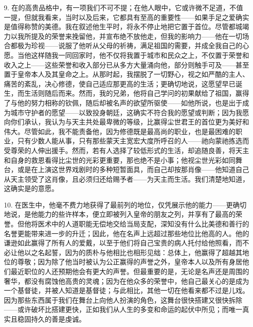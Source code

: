 9. 在的高贵品格中，有一项我们不可不提；在他人眼中，它或许微不足道，不值一提，但就我看来，当时以及后来，它都具有至高的重要性——如果手足之爱确实是值得称赞的美德。我在叙述他生平时，将永不停止地把它置于首位。尽管都城竭力以我所提及的荣誉来挽留他，并宣布绝不放他走，但我的影响力——他在一切场合都极为珍视——说服了他听从父母的祈祷，满足祖国的需要，并成全我自己的心愿。当他这样随我一同回家时，他不仅将我置于城市和民众之上，不仅置于荣誉和收入之上——这些荣誉和收入部分已从多方大量涌向他，部分则触手可及——甚至置于皇帝本人及其皇命之上。从那时起，我摆脱了一切野心，视之如严酷的主人、痛苦的紊乱，决心修德，使自己适应那更高的生活；更确切地说，这愿望早已诞生，而生活则随后而来。然而，我的兄弟，他将自己学问的初果献给了祖国，赢得了与他的努力相称的钦佩，随后却被名声的欲望所驱使——如他所说，也是出于成为城市守护者的愿望——以致投身朝廷，这确实不符合我的愿望或判断；因为我愿向你们承认，我认为与天主共处最卑微的等级，比赢得尘世君王的首位更为美好和伟大。尽管如此，我不能责备他，因为修德既是最高尚的职业，也是最困难的职业，只有少数人能从事，只有那些蒙天主宽宏大度所呼召的人——祂向蒙祂拣选而受尊荣的人伸出援手。然而，若有人选择了较低形式的生活，却追随良善，将天主和自身的救恩看得比尘世的光彩更重要，那也绝不是小事；他视尘世光彩如同舞台，或是在上演这世界戏剧时的多种短暂面具，而自己却按那肖像——他知道自己从天主领受了这肖像，且必须归还给赐予者——为天主而生活。我们清楚地知道，这确实是的意愿。\par

10. 在医生中，他毫不费力地获得了最前列的地位，仅凭展示他的能力——更确切地说，是他能力的些许样本，便立即被列入皇帝的朋友之列，并享有了最高的荣誉。但他将医术中的人道职能无偿地交给当局支配，深知没有什么比美德和善行的名誉更能带来进一步的升迁；因此，他在名声上远超过那些地位比他高的人。他的谦逊如此赢得了所有人的爱戴，以至于他们将自己宝贵的病人托付给他照看，而不必让他以之名起誓，因为的质朴与他相比也相形见绌：总体上，他赢得了超越其地位的尊敬；因为除了他当时被认为公正赢得的声誉之外，皇帝本人以及所有身居他们最近职位的人还预期他会有更大的声誉。但最重要的是，无论是名声还是周围的奢华，都没有腐蚀他高贵的灵魂；因为在他众多的荣誉中，他自己最关心的是成为一个基督徒，并被人知道是基督徒；与此相比，其他一切在他看来都不过是儿戏。因为那些东西属于我们在舞台上向他人扮演的角色，这舞台很快搭建又很快拆除——或许破坏比搭建更快，正如我们从人生的多变和命运的起伏中所见；而唯一真实且稳固持久的善是虔诚。\par

